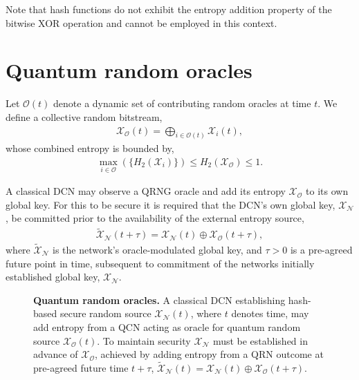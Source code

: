 Note that hash functions do not exhibit the entropy addition property of the bitwise XOR operation and cannot be employed in this context.

\section{Quantum random oracles} \label{sec:quantum_rand_oracles}

Let $\mathcal{O}(t)$ denote a dynamic set of contributing random oracles at  time $t$. We define a collective random bitstream,
\begin{align}
	\mathcal{X}_\mathcal{O}(t) = \bigoplus_{i\in\mathcal{O}(t)} \mathcal{X}_i(t),
\end{align}
whose combined entropy is bounded by,
\begin{align}
	\max_{i\in\mathcal{O}}(\{H_2(\mathcal{X}_i)\}) \leq H_2(\mathcal{X}_{\mathcal{O}}) \leq 1.
\end{align}

A classical DCN may observe a QRNG oracle and add its entropy $\mathcal{X}_\mathcal{O}$ to its own global key. For this to be secure it is required that the DCN's own global key, $\mathcal{X}_\mathcal{N}$, be committed prior to the availability of the external entropy source,
\begin{align}
	{\mathcal{\tilde X}}_\mathcal{N}(t+\tau) = \mathcal{X}_\mathcal{N}(t) \oplus \mathcal{X}_\mathcal{O}(t+\tau),
\end{align}
where ${\mathcal{\tilde X}}_\mathcal{N}$ is the network's oracle-modulated global key, and \mbox{$\tau>0$} is a pre-agreed future point in time, subsequent to commitment of the networks initially established global key, $\mathcal{X}_\mathcal{N}$.

\begin{figure}
\begin{center}
	
\caption{\textbf{Quantum random oracles.} A classical DCN establishing hash-based secure random source $\mathcal{X}_\mathcal{N}(t)$, where $t$ denotes time, may add entropy from a QCN acting as oracle for quantum random source $\mathcal{X}_\mathcal{O}(t)$. To maintain security $\mathcal{X}_\mathcal{N}$ must be established in advance of $\mathcal{X}_\mathcal{O}$, achieved by adding entropy from a QRN outcome at pre-agreed future time $t+\tau$, $\tilde{\mathcal{X}}_\mathcal{N}(t) = \mathcal{X}_\mathcal{N}(t) \oplus \mathcal{X}_\mathcal{O}(t+\tau)$.}
\label{fig:QRNG_oracle}
\end{center}
\end{figure}

